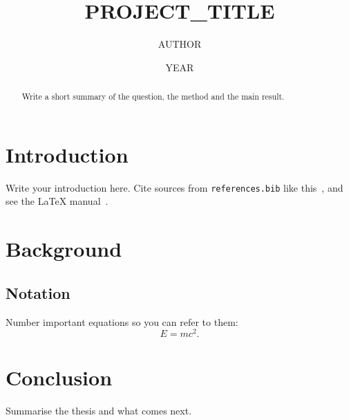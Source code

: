 \documentclass[oneside]{hepthesis}
\title{{{PROJECT_TITLE}}}
\author{{{AUTHOR}}}
\date{{{YEAR}}}
\begin{document}
\begin{frontmatter}
  \begin{abstract}
    Write a short summary of the question, the method and the main result.
  \end{abstract}
  \tableofcontents
\end{frontmatter}

\begin{mainmatter}
\chapter{Introduction}
Write your introduction here. Cite sources from \texttt{references.bib} like
this~\cite{einstein1905}, and see the \LaTeX{} manual~\cite{lamport1994}.

\chapter{Background}
\section{Notation}
Number important equations so you can refer to them:
\begin{equation}
  E = mc^2 . \label{eq:energy}
\end{equation}

\chapter{Conclusion}
Summarise the thesis and what comes next.

\end{mainmatter}

\begin{backmatter}
  
  
\end{backmatter}
\end{document}
